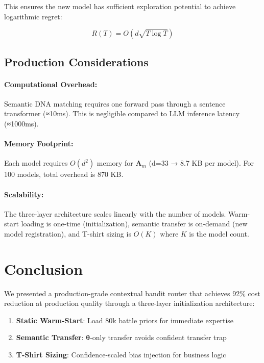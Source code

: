 \documentclass[sigconf]{acmart}
\begin{document}
This ensures the new model has sufficient exploration potential to achieve logarithmic regret:

\begin{equation}
R(T) = O\left( d\sqrt{T \log T} \right)
\end{equation}

\subsection{Production Considerations}

\paragraph{Computational Overhead:} Semantic DNA matching requires one forward pass through a sentence transformer (≈10ms). This is negligible compared to LLM inference latency (≈1000ms).

\paragraph{Memory Footprint:} Each model requires $O(d^2)$ memory for $\mathbf{A}_m$ (d=33 → 8.7 KB per model). For 100 models, total overhead is 870 KB.

\paragraph{Scalability:} The three-layer architecture scales linearly with the number of models. Warm-start loading is one-time (initialization), semantic transfer is on-demand (new model registration), and T-shirt sizing is $O(K)$ where $K$ is the model count.

\section{Conclusion}

We presented a production-grade contextual bandit router that achieves 92\% cost reduction at production quality through a three-layer initialization architecture:

\begin{enumerate}
    \item \textbf{Static Warm-Start}: Load 80k battle priors for immediate expertise
    \item \textbf{Semantic Transfer}: $\boldsymbol{\theta}$-only transfer avoids confident transfer trap
    \item \textbf{T-Shirt Sizing}: Confidence-scaled bias injection for business logic
\end{enumerate}
\end{document}
